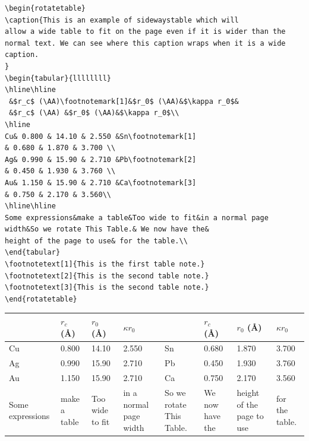 \documentclass[reprint]{JASA}
\begin{document}
\begin{verbatim}
\begin{rotatetable}
\caption{This is an example of sidewaystable which will
allow a wide table to fit on the page even if it is wider than the 
normal text. We can see where this caption wraps when it is a wide
caption.
}
\begin{tabular}{llllllll}
\hline\hline
 &$r_c$ (\AA)\footnotemark[1]&$r_0$ (\AA)&$\kappa r_0$&
 &$r_c$ (\AA) &$r_0$ (\AA)&$\kappa r_0$\\
\hline
Cu& 0.800 & 14.10 & 2.550 &Sn\footnotemark[1]
& 0.680 & 1.870 & 3.700 \\
Ag& 0.990 & 15.90 & 2.710 &Pb\footnotemark[2]
& 0.450 & 1.930 & 3.760 \\
Au& 1.150 & 15.90 & 2.710 &Ca\footnotemark[3]
& 0.750 & 2.170 & 3.560\\
\hline\hline
Some expressions&make a table&Too wide to fit&in a normal page
width&So we rotate This Table.& We now have the&
height of the page to use& for the table.\\
\end{tabular}
\footnotetext[1]{This is the first table note.}
\footnotetext[2]{This is the second table note.}
\footnotetext[3]{This is the second table note.}
\end{rotatetable}
\end{verbatim}

\begin{rotatetable}
\caption{This is an example of sidewaystable which will
allow a wide table to fit on the page even if it is wider than the 
normal text. We can see where this caption wraps when it is a wide
caption.
}
\begin{tabular}{llllllll}
\hline\hline
 &$r_c$ (\AA)\footnotemark[1]&$r_0$ (\AA)&$\kappa r_0$&
 &$r_c$ (\AA) &$r_0$ (\AA)&$\kappa r_0$\\
\hline
Cu& 0.800 & 14.10 & 2.550 &Sn\footnotemark[1]
& 0.680 & 1.870 & 3.700 \\
Ag& 0.990 & 15.90 & 2.710 &Pb\footnotemark[2]
& 0.450 & 1.930 & 3.760 \\
Au& 1.150 & 15.90 & 2.710 &Ca\footnotemark[3]
& 0.750 & 2.170 & 3.560\\
\hline\hline
Some expressions&make a table&Too wide to fit&in a normal page
width&So we rotate This Table.& We now have the&
height of the page to use& for the table.\\
\end{tabular}
\end{rotatetable}
\end{document}
